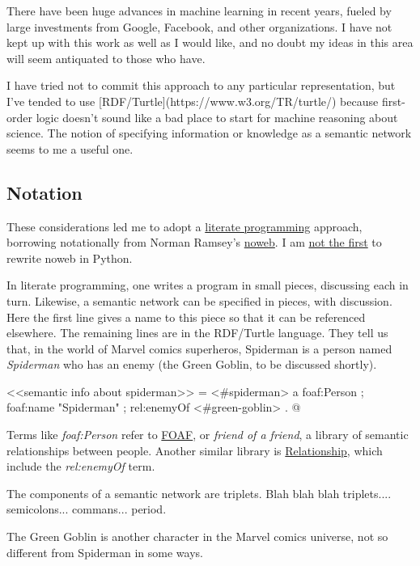 \documentclass{article}
\begin{document}
There have been huge advances in machine learning in recent years, fueled by large
investments from Google, Facebook, and other organizations. I have not kept up with
this work as well as I would like, and no doubt my ideas in this area will seem
antiquated to those who have.

I have tried not to commit this approach to any particular representation, but I've
tended to use [RDF/Turtle](https://www.w3.org/TR/turtle/) because first-order logic
doesn't sound like a bad place to start for machine reasoning about science. The notion
of specifying information or knowledge as a semantic network seems to me a useful one.

\subsection{Notation}

These considerations led me to adopt a
\href{https://en.wikipedia.org/wiki/Literate_programming}{literate programming} approach,
borrowing notationally from Norman Ramsey's \href{http://www.cs.tufts.edu/~nr/noweb/}{noweb}.
I am \href{https://github.com/JonathanAquino/noweb.py}{not the first} to rewrite noweb in
Python.

In literate programming, one writes a program in small pieces, discussing each in turn.
Likewise, a semantic network can be specified in pieces, with discussion. Here the first
line gives a name to this piece so that it can be referenced elsewhere. The remaining
lines are in the RDF/Turtle language. They tell us that, in the world of Marvel comics
superheros, Spiderman is a person named \textit{Spiderman} who has an enemy (the Green Goblin,
to be discussed shortly).

<<semantic info about spiderman>> =
<#spiderman>
    a foaf:Person ;
    foaf:name "Spiderman" ;
    rel:enemyOf <#green-goblin> .
@

Terms like \textit{foaf:Person} refer to \href{http://xmlns.com/foaf/spec/}{FOAF}, or
\textit{friend of a friend}, a library of semantic relationships between people. Another
similar library is \href{http://vocab.org/relationship/}{Relationship}, which include the
\textit{rel:enemyOf} term.

The components of a semantic network are triplets. Blah blah blah triplets....
semicolons... commans... period.

The Green Goblin is another character in the Marvel comics universe, not so different
from Spiderman in some ways.
\end{document}
